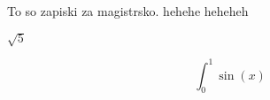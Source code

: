 \documentclass[a4paper]{article}
\begin{document}
To so zapiski za magistrsko. hehehe
heheheh

$\sqrt{5}$

$$
	\int_{0}^{1} \sin(x)
$$

            
\end{document}
